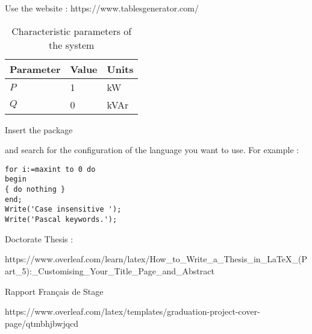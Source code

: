 
Use the website : https://www.tablesgenerator.com/

\begin{table}[tb]
	\centering
	\begin{tabular}{lll}
		Parameter & Value & Units\\
		\hline
		$P$ & 1 & kW \\
		$Q$ & 0 & kVAr\\
	    \hline
	\end{tabular}
	\caption{Characteristic parameters of the system}
	\label{tab:tab1}
\end{table}



Insert the package \usepackage{listings} and search for the configuration of the language you want to use. For example : 

\usepackage{listings} %

\begin{lstlisting}[caption=Source code for {\it hello.m},label=lst:code1,breaklines=true,basewidth=4pt,prebreak=**,postbreak=**,frame=single]
for i:=maxint to 0 do
begin
{ do nothing }
end;
Write('Case insensitive ');
Write('Pascal keywords.');
\end{lstlisting}
   


Doctorate Thesis : 

https://www.overleaf.com/learn/latex/How_to_Write_a_Thesis_in_LaTeX_(Part_5):_Customising_Your_Title_Page_and_Abstract

Rapport Français de Stage

https://www.overleaf.com/latex/templates/graduation-project-cover-page/qtmbhjbwjqcd


